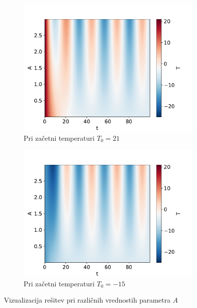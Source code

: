 \documentclass{article}
\begin{document}
\begin{figure}[H]
    \centering
    \begin{subfigure}{0.49\textwidth}
        \centering
        \includegraphics[width=\linewidth]{family21.02.pdf}
		\caption{Pri začetni temperaturi $T_0=21$}
        \label{fig:image1}
    \end{subfigure}
    \hfill
    \begin{subfigure}{0.49\textwidth}
        \centering
		\includegraphics[width=\linewidth]{family-15.02.pdf}
		\caption{Pri začetni temperaturi $T_0=-15$}
        \label{fig:image2}
    \end{subfigure}
	\caption{Vizualizacija rešitev pri različnih vrednostih parametra $A$}
\end{figure}
\newpage
\end{document}
